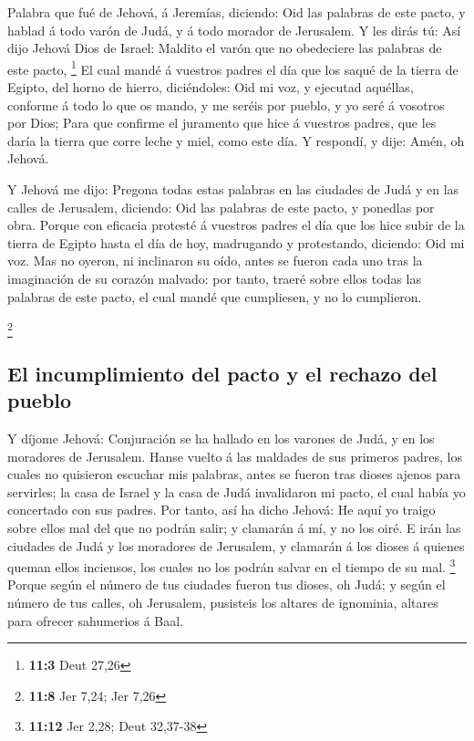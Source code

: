  Palabra que fué de Jehová, á Jeremías, diciendo:
 Oid las palabras de este pacto, y hablad á todo varón de
Judá, y á todo morador de Jerusalem.  Y les dirás tú: Así
dijo Jehová Dios de Israel: Maldito el varón que no obedeciere las
palabras de este pacto, \footnote{\textbf{11:3} Deut 27,26}
 El cual mandé á vuestros padres el día que los saqué de
la tierra de Egipto, del horno de hierro, diciéndoles: Oid mi voz, y
ejecutad aquéllas, conforme á todo lo que os mando, y me seréis por
pueblo, y yo seré á vosotros por Dios;  Para que confirme
el juramento que hice á vuestros padres, que les daría la tierra que
corre leche y miel, como este día. Y respondí, y dije: Amén, oh Jehová.

 Y Jehová me dijo: Pregona todas estas palabras en las
ciudades de Judá y en las calles de Jerusalem, diciendo: Oid las
palabras de este pacto, y ponedlas por obra.  Porque con
eficacia protesté á vuestros padres el día que los hice subir de la
tierra de Egipto hasta el día de hoy, madrugando y protestando,
diciendo: Oid mi voz.  Mas no oyeron, ni inclinaron su
oído, antes se fueron cada uno tras la imaginación de su corazón
malvado: por tanto, traeré sobre ellos todas las palabras de este pacto,
el cual mandé que cumpliesen, y no lo cumplieron.

\footnote{\textbf{11:8} Jer 7,24; Jer 7,26}

\hypertarget{el-incumplimiento-del-pacto-y-el-rechazo-del-pueblo}{%
\subsection{El incumplimiento del pacto y el rechazo del
pueblo}\label{el-incumplimiento-del-pacto-y-el-rechazo-del-pueblo}}

 Y díjome Jehová: Conjuración se ha hallado en los varones
de Judá, y en los moradores de Jerusalem.  Hanse vuelto á
las maldades de sus primeros padres, los cuales no quisieron escuchar
mis palabras, antes se fueron tras dioses ajenos para servirles; la casa
de Israel y la casa de Judá invalidaron mi pacto, el cual había yo
concertado con sus padres.  Por tanto, así ha dicho
Jehová: He aquí yo traigo sobre ellos mal del que no podrán salir; y
clamarán á mí, y no los oiré.  E irán las ciudades de
Judá y los moradores de Jerusalem, y clamarán á los dioses á quienes
queman ellos inciensos, los cuales no los podrán salvar en el tiempo de
su mal. \footnote{\textbf{11:12} Jer 2,28; Deut 32,37-38}
 Porque según el número de tus ciudades fueron tus
dioses, oh Judá; y según el número de tus calles, oh Jerusalem,
pusisteis los altares de ignominia, altares para ofrecer sahumerios á
Baal.

